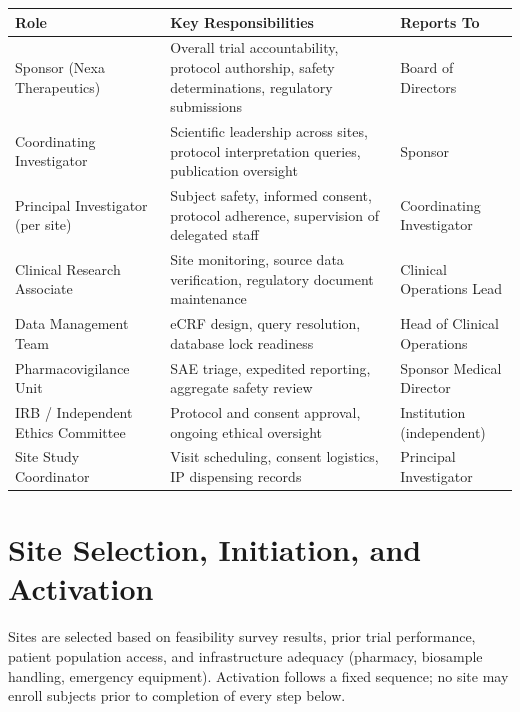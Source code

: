 \documentclass[11pt,a4paper]{scrreprt}
\begin{document}
\begin{center}
\small
\begin{tabularx}{\linewidth}{@{} >{\raggedright\arraybackslash}p{3.3cm} X >{\raggedright\arraybackslash}p{3.0cm} @{}}
\toprule
\rowcolor{sopnavy}
{\color{white}\textbf{Role}} & {\color{white}\textbf{Key Responsibilities}} & {\color{white}\textbf{Reports To}} \\
\midrule
Sponsor (Nexa Therapeutics) & Overall trial accountability, protocol authorship, safety
  determinations, regulatory submissions & Board of Directors \\
\rowcolor{soplight}
Coordinating Investigator & Scientific leadership across sites, protocol interpretation
  queries, publication oversight & Sponsor \\
Principal Investigator (per site) & Subject safety, informed consent, protocol adherence,
  supervision of delegated staff & Coordinating Investigator \\
\rowcolor{soplight}
Clinical Research Associate & Site monitoring, source data verification, regulatory document
  maintenance & Clinical Operations Lead \\
Data Management Team & eCRF design, query resolution, database lock readiness & Head of
  Clinical Operations \\
\rowcolor{soplight}
Pharmacovigilance Unit & SAE triage, expedited reporting, aggregate safety review & Sponsor
  Medical Director \\
IRB / Independent Ethics Committee & Protocol and consent approval, ongoing ethical oversight
  & Institution (independent) \\
\rowcolor{soplight}
Site Study Coordinator & Visit scheduling, consent logistics, IP dispensing records &
  Principal Investigator \\
\bottomrule
\end{tabularx}
\end{center}

\section{Site Selection, Initiation, and Activation}

Sites are selected based on feasibility survey results, prior trial performance, patient
population access, and infrastructure adequacy (pharmacy, biosample handling, emergency
equipment). Activation follows a fixed sequence; no site may enroll subjects prior to
completion of every step below.
\end{document}
